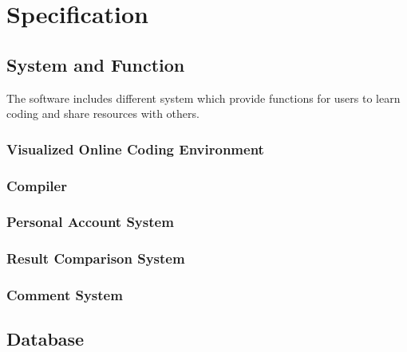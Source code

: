 \chapter{Specification}
\section{System and Function}
The software includes different system which provide functions for users to learn coding and share resources with others.
\subsection{Visualized Online Coding Environment}
	
\subsection{Compiler}
\subsection{Personal Account System}
	
\subsection{Result Comparison System}
\subsection{Comment System}
\section{Database}
